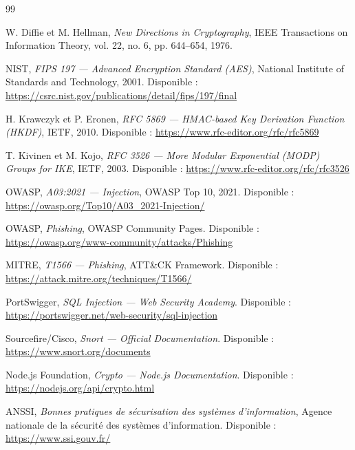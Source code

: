 \documentclass[12pt,a4paper]{report}
\begin{document}
\begin{thebibliography}{99}

  W. Diffie et M. Hellman,
  \textit{New Directions in Cryptography},
  IEEE Transactions on Information Theory, vol. 22, no. 6, pp. 644--654, 1976.

  NIST,
  \textit{FIPS 197 — Advanced Encryption Standard (AES)},
  National Institute of Standards and Technology, 2001.
  Disponible : \url{https://csrc.nist.gov/publications/detail/fips/197/final}

  H. Krawczyk et P. Eronen,
  \textit{RFC 5869 — HMAC-based Key Derivation Function (HKDF)},
  IETF, 2010.
  Disponible : \url{https://www.rfc-editor.org/rfc/rfc5869}

  T. Kivinen et M. Kojo,
  \textit{RFC 3526 — More Modular Exponential (MODP) Groups for IKE},
  IETF, 2003.
  Disponible : \url{https://www.rfc-editor.org/rfc/rfc3526}

  OWASP,
  \textit{A03:2021 — Injection},
  OWASP Top 10, 2021.
  Disponible : \url{https://owasp.org/Top10/A03_2021-Injection/}

  OWASP,
  \textit{Phishing},
  OWASP Community Pages.
  Disponible : \url{https://owasp.org/www-community/attacks/Phishing}

  MITRE,
  \textit{T1566 — Phishing},
  ATT\&CK Framework.
  Disponible : \url{https://attack.mitre.org/techniques/T1566/}

  PortSwigger,
  \textit{SQL Injection — Web Security Academy}.
  Disponible : \url{https://portswigger.net/web-security/sql-injection}

  Sourcefire/Cisco,
  \textit{Snort — Official Documentation}.
  Disponible : \url{https://www.snort.org/documents}

  Node.js Foundation,
  \textit{Crypto — Node.js Documentation}.
  Disponible : \url{https://nodejs.org/api/crypto.html}

  ANSSI,
  \textit{Bonnes pratiques de sécurisation des systèmes d'information},
  Agence nationale de la sécurité des systèmes d'information.
  Disponible : \url{https://www.ssi.gouv.fr/}

\end{thebibliography}
\end{document}
